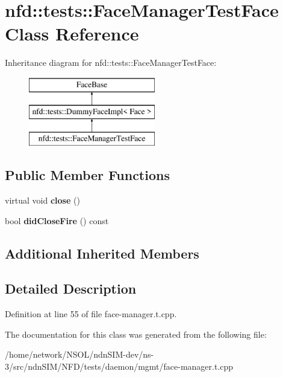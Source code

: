 \hypertarget{classnfd_1_1tests_1_1FaceManagerTestFace}{}\section{nfd\+:\+:tests\+:\+:Face\+Manager\+Test\+Face Class Reference}
\label{classnfd_1_1tests_1_1FaceManagerTestFace}
Inheritance diagram for nfd\+:\+:tests\+:\+:Face\+Manager\+Test\+Face\+:\begin{figure}[H]
\begin{center}
\leavevmode
\includegraphics[height=3.000000cm]{classnfd_1_1tests_1_1FaceManagerTestFace}
\end{center}
\end{figure}
\subsection*{Public Member Functions}
\begin{DoxyCompactItemize}
\item 
virtual void {\bfseries close} ()\hypertarget{classnfd_1_1tests_1_1FaceManagerTestFace_ac883bb1491d9b8ad09391f91157cfccf}{}\label{classnfd_1_1tests_1_1FaceManagerTestFace_ac883bb1491d9b8ad09391f91157cfccf}

\item 
bool {\bfseries did\+Close\+Fire} () const\hypertarget{classnfd_1_1tests_1_1FaceManagerTestFace_a71b678e07becf5bb8075ededb7aef656}{}\label{classnfd_1_1tests_1_1FaceManagerTestFace_a71b678e07becf5bb8075ededb7aef656}

\end{DoxyCompactItemize}
\subsection*{Additional Inherited Members}


\subsection{Detailed Description}


Definition at line 55 of file face-\/manager.\+t.\+cpp.



The documentation for this class was generated from the following file\+:\begin{DoxyCompactItemize}
\item 
/home/network/\+N\+S\+O\+L/ndn\+S\+I\+M-\/dev/ns-\/3/src/ndn\+S\+I\+M/\+N\+F\+D/tests/daemon/mgmt/face-\/manager.\+t.\+cpp\end{DoxyCompactItemize}
